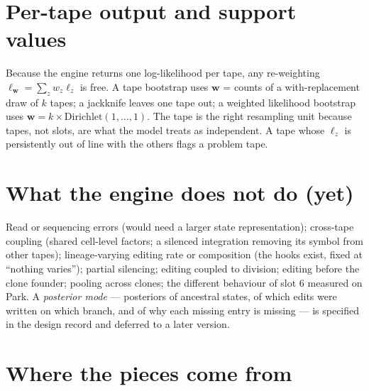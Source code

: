 \documentclass[11pt]{article}
\begin{document}
\section{Per-tape output and support values}\label{sec:support}

Because the engine returns one log-likelihood per tape, any re-weighting
$\ell_{\mathbf w}=\sum_zw_z\ell_z$ is free. A tape bootstrap uses $\mathbf w$ = counts of a
with-replacement draw of $k$ tapes; a jackknife leaves one tape out; a weighted likelihood bootstrap
uses $\mathbf w=k\times\mathrm{Dirichlet}(1,\dots,1)$. The tape is the right resampling unit because
tapes, not slots, are what the model treats as independent. A tape whose $\ell_z$ is persistently out
of line with the others flags a problem tape.

\section{What the engine does not do (yet)}\label{sec:excl}
Read or sequencing errors (would need a larger state representation); cross-tape coupling (shared
cell-level factors; a silenced integration removing its symbol from other tapes); lineage-varying
editing rate or composition (the hooks exist, fixed at ``nothing varies''); partial silencing;
editing coupled to division; editing before the clone founder; pooling across clones; the different
behaviour of slot 6 measured on Park. A \emph{posterior mode} --- posteriors of ancestral states, of
which edits were written on which branch, and of why each missing entry is missing --- is specified
in the design record and deferred to a later version.

\section{Where the pieces come from}\label{sec:prov}
\end{document}
